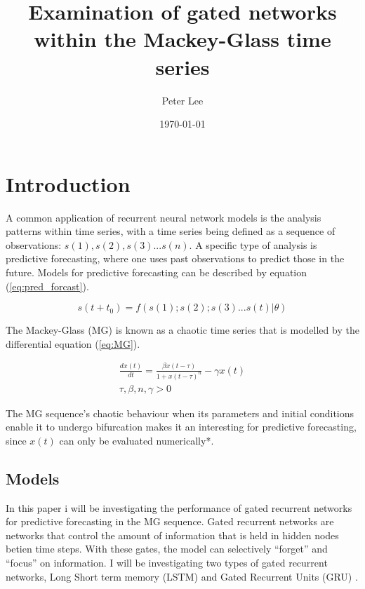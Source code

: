\documentclass[11pt]{article}
\author{Peter Lee}
\date{\today}
\title{Examination of gated networks within the Mackey-Glass time series}
\begin{document}
\maketitle

\section{Introduction}
A common application of recurrent neural network models is the
analysis patterns within time series, with a time series being defined
as a sequence of observations: $s(1), s(2), s(3)... s(n)$. A specific
type of analysis is predictive forecasting, where one uses past
observations to predict those in the future. Models for predictive
forecasting can be described by equation (\ref{eq:pred_forcast}).

\begin{equation}
  s(t+t_0)=f(s(1);s(2);s(3)...s(t) | \theta)
  \label{eq:pred_forcast}
\end{equation}

The Mackey-Glass (MG) \cite{MG} is known as a chaotic time series that is
modelled by the differential equation (\ref{eq:MG}).

\begin{equation}
  \begin{split}
\frac{dx(t)}{dt} = \frac{\beta x(t-\tau)}{1+x(t- \tau)^n} - \gamma x(t)\\
\tau,\beta,n,\gamma > 0
\label{eq:MG}
  \end{split}
\end{equation}

The MG sequence's chaotic behaviour when its parameters and initial
conditions enable it to undergo bifurcation makes it an interesting
for predictive forecasting, since $x(t)$ can only be evaluated
numerically*.

\subsection{Models}

In this paper i will be investigating the performance of gated
recurrent networks for predictive forecasting in the MG
sequence. Gated recurrent networks are networks that control the
amount of information that is held in hidden nodes betien time
steps. With these gates, the model can selectively ``forget''
and ``focus'' on information. I will be investigating two types of
gated recurrent networks, Long Short term memory (LSTM) \cite{LSTM}
and Gated Recurrent Units (GRU) \cite{GRU}. 
 
\end{document}
